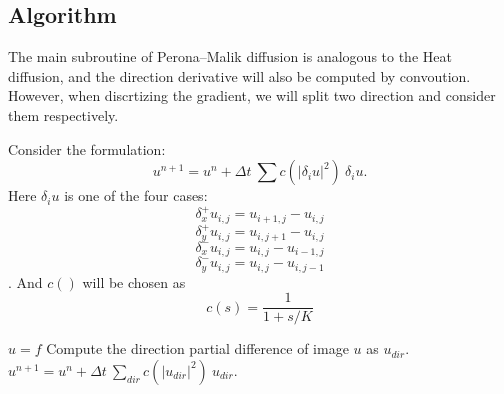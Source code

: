 \documentclass{article}
\begin{document}
\subsection{Algorithm}
The main subroutine of Perona--Malik diffusion is analogous to the Heat diffusion, and the direction derivative will also be computed by convoution. However, when discrtizing the gradient, we will split two direction and consider them respectively. 

Consider the formulation:
$$u^{n+1} = u^{n} + \Delta t~\sum c(|\delta_i u|^2)~\delta_i u.$$
Here $\delta_i u$ is one of the four cases:
$$\delta_x^+ u_{i,j} = u_{i+1,j}-u_{i,j}$$
$$\delta_y^+ u_{i,j} = u_{i,j+1}-u_{i,j}$$
$$\delta_x^- u_{i,j} = u_{i,j}-u_{i-1,j}$$
$$\delta_y^- u_{i,j} = u_{i,j}-u_{i,j-1}$$.
And $c()$ will be chosen as $$c(s) = \frac{1}{1+s/K}$$

\begin{algorithm}
\caption{$u = perona\_malik(f,T,\Delta t,c)$}
\begin{algorithmic}[1]
\STATE $u=f$
\STATE Compute the direction partial difference of image $u$ as $u_{dir}$.
\ENDFOR
\STATE $u^{n+1} = u^{n} + \Delta t~\sum_{dir}c(|u_{dir}|^2)~u_{dir}.$
\ENDFOR
\end{algorithmic}
\end{algorithm}
\end{document}
